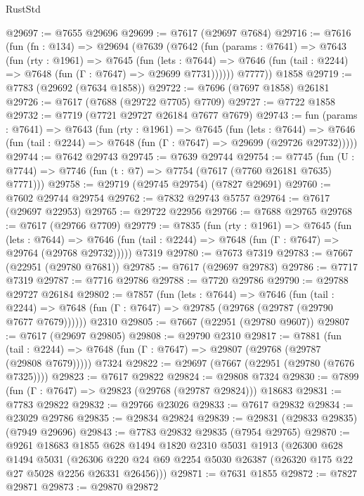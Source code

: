 \begin{lexlean}{RustStd}
\begin{coremodule}
@29697 := @7655 @29696
@29699 := @7617 (@29697 @7684)
@29716 := @7616
    (fun (fn : @134) =>
    @29694
      (@7639
        (@7642
          (fun (params : @7641) =>
          @7643
            (fun (rty : @1961) =>
            @7645
              (fun (lets : @7644) =>
              @7646 (fun (tail : @2244) => @7648 (fun (Γ : @7647) => @29699 @7731))))))
        @7777))
    @1858
@29719 := @7783 (@29692 (@7634 @1858))
@29722 := @7696 (@7697 @1858) @26181
@29726 := @7617 (@7688 (@29722 @7705) @7709)
@29727 := @7722 @1858
@29732 := @7719 (@7721 @29727 @26184 @7677 @7679)
@29743 := fun (params : @7641) =>
  @7643
    (fun (rty : @1961) =>
    @7645
      (fun (lets : @7644) =>
      @7646 (fun (tail : @2244) => @7648 (fun (Γ : @7647) => @29699 (@29726 @29732)))))
@29744 := @7642 @29743
@29745 := @7639 @29744
@29754 := @7745
    (fun (U : @7744) => @7746 (fun (t : @7) => @7754 (@7617 (@7760 @26181 @7635) @7771)))
@29758 := @29719 (@29745 @29754) (@7827 @29691)
@29760 := @7602 @29744 @29754
@29762 := @7832 @29743 @5757
@29764 := @7617 (@29697 @22953)
@29765 := @29722 @22956
@29766 := @7688 @29765
@29768 := @7617 (@29766 @7709)
@29779 := @7835
    (fun (rty : @1961) =>
    @7645
      (fun (lets : @7644) =>
      @7646 (fun (tail : @2244) => @7648 (fun (Γ : @7647) => @29764 (@29768 @29732)))))
    @7319
@29780 := @7673 @7319
@29783 := @7667 (@22951 (@29780 @7681))
@29785 := @7617 (@29697 @29783)
@29786 := @7717 @7319
@29787 := @7716 @29786
@29788 := @7720 @29786
@29790 := @29788 @29727 @26184
@29802 := @7857
    (fun (lets : @7644) =>
    @7646
      (fun (tail : @2244) =>
      @7648 (fun (Γ : @7647) => @29785 (@29768 (@29787 (@29790 @7677 @7679))))))
    @2310
@29805 := @7667 (@22951 (@29780 @9607))
@29807 := @7617 (@29697 @29805)
@29808 := @29790 @2310
@29817 := @7881
    (fun (tail : @2244) => @7648 (fun (Γ : @7647) => @29807 (@29768 (@29787 (@29808 @7679)))))
    @7324
@29822 := @29697 (@7667 (@22951 (@29780 (@7676 @7325))))
@29823 := @7617 @29822
@29824 := @29808 @7324
@29830 := @7899 (fun (Γ : @7647) => @29823 (@29768 (@29787 @29824))) @18683
@29831 := @7783 @29822
@29832 := @29766 @23026
@29833 := @7617 @29832
@29834 := @23029 @29786
@29835 := @29834 @29824
@29839 := @29831 (@29833 @29835) (@7949 @29696)
@29843 := @7783 @29832 @29835 (@7954 @29765)
@29870 := @9261
    @18683
    @1855
    @628
    @1494
    @1820
    @2310
    @5031
    @1913
    (@26300
      @628
      @1494
      @5031
      (@26306 @220 @24 @69 @2254 @5030 @26387 (@26320 @175 @22 @27 @5028 @2256 @26331 @26456)))
@29871 := @7631 @1855
@29872 := @7827 @29871
@29873 := @29870 @29872

\end{coremodule}
\end{lexlean}

